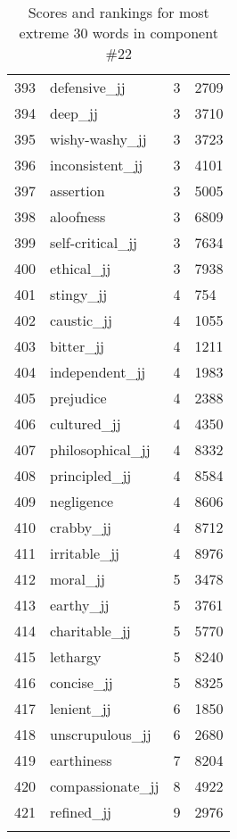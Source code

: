 \begin{longtable}[!htbp]{| rlr@{.}l |}
    393 & defensive\_jj & 3 & 2709 \\
    394 & deep\_jj & 3 & 3710 \\
    395 & wishy-washy\_jj & 3 & 3723 \\
    396 & inconsistent\_jj & 3 & 4101 \\
    397 & assertion & 3 & 5005 \\
    398 & aloofness & 3 & 6809 \\
    399 & self-critical\_jj & 3 & 7634 \\
    400 & ethical\_jj & 3 & 7938 \\
    401 & stingy\_jj & 4 & 754 \\
    402 & caustic\_jj & 4 & 1055 \\
    403 & bitter\_jj & 4 & 1211 \\
    404 & independent\_jj & 4 & 1983 \\
    405 & prejudice & 4 & 2388 \\
    406 & cultured\_jj & 4 & 4350 \\
    407 & philosophical\_jj & 4 & 8332 \\
    408 & principled\_jj & 4 & 8584 \\
    409 & negligence & 4 & 8606 \\
    410 & crabby\_jj & 4 & 8712 \\
    411 & irritable\_jj & 4 & 8976 \\
    412 & moral\_jj & 5 & 3478 \\
    413 & earthy\_jj & 5 & 3761 \\
    414 & charitable\_jj & 5 & 5770 \\
    415 & lethargy & 5 & 8240 \\
    416 & concise\_jj & 5 & 8325 \\
    417 & lenient\_jj & 6 & 1850 \\
    418 & unscrupulous\_jj & 6 & 2680 \\
    419 & earthiness & 7 & 8204 \\
    420 & compassionate\_jj & 8 & 4922 \\
    421 & refined\_jj & 9 & 2976 \\
    \hline
    \caption{Scores and rankings for most extreme 30 words in component \#22} \\
\end{longtable}
